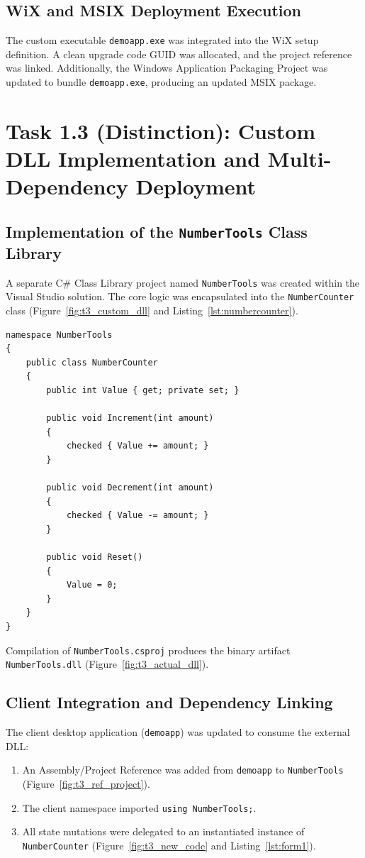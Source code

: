 \documentclass[11pt,a4paper]{article}
\begin{document}
\subsection{WiX and MSIX Deployment Execution}
The custom executable \texttt{demoapp.exe} was integrated into the WiX setup definition. A clean upgrade code GUID was allocated, and the project reference was linked. Additionally, the Windows Application Packaging Project was updated to bundle \texttt{demoapp.exe}, producing an updated MSIX package.

\newpage

\section{Task 1.3 (Distinction): Custom DLL Implementation and Multi-Dependency Deployment}

\subsection{Implementation of the \texttt{NumberTools} Class Library}
A separate C\# Class Library project named \texttt{NumberTools} was created within the Visual Studio solution. The core logic was encapsulated into the \texttt{NumberCounter} class (Figure~\ref{fig:t3_custom_dll} and Listing~\ref{lst:numbercounter}).

\begin{lstlisting}[language={[Sharp]C}, caption={\texttt{NumberCounter.cs} Class Library Implementation}, label={lst:numbercounter}]
namespace NumberTools
{
    public class NumberCounter
    {
        public int Value { get; private set; }

        public void Increment(int amount)
        {
            checked { Value += amount; }
        }

        public void Decrement(int amount)
        {
            checked { Value -= amount; }
        }

        public void Reset()
        {
            Value = 0;
        }
    }
}
\end{lstlisting}

Compilation of \texttt{NumberTools.csproj} produces the binary artifact \texttt{NumberTools.dll} (Figure~\ref{fig:t3_actual_dll}).

\subsection{Client Integration and Dependency Linking}
The client desktop application (\texttt{demoapp}) was updated to consume the external DLL:
\begin{enumerate}[leftmargin=1.2cm]
    \item An Assembly/Project Reference was added from \texttt{demoapp} to \texttt{NumberTools} (Figure~\ref{fig:t3_ref_project}).
    \item The client namespace imported \texttt{using NumberTools;}.
    \item All state mutations were delegated to an instantiated instance of \texttt{NumberCounter} (Figure~\ref{fig:t3_new_code} and Listing~\ref{lst:form1}).
\end{enumerate}
\end{document}
